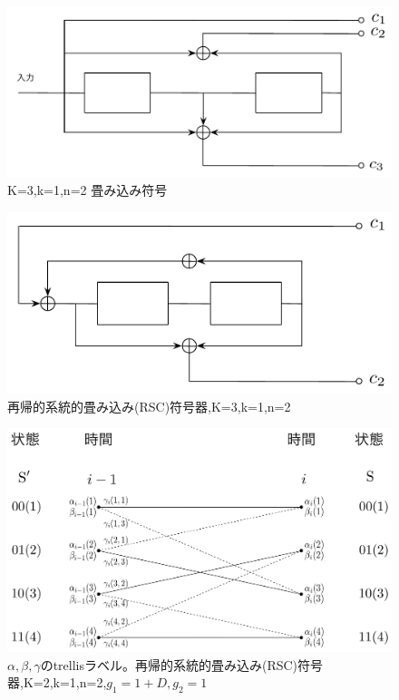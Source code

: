 \documentclass[20 pts]{article}
\begin{document}
\begin{figure}
\includegraphics[width=15cm]{figure1.pdf}
\caption{K=3,k=1,n=2 畳み込み符号}
\label{図1}
\end{figure}%

\newpage
\begin{figure}
\includegraphics[width=15cm]{figure2.pdf}
\caption{再帰的系統的畳み込み(RSC)符号器,K=3,k=1,n=2}
\label{図2}
\end{figure}%

\begin{figure}
\includegraphics[width=15cm]{figure3.pdf}
\caption{$\alpha,\beta,\gamma$のtrellisラベル。再帰的系統的畳み込み(RSC)符号器,K=2,k=1,n=2,$g_1=1+D,g_2=1$}
\label{図2}
\end{figure}%
\end{document}
